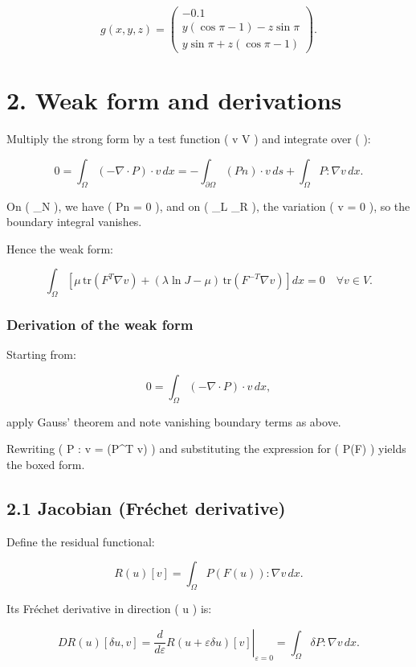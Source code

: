 \documentclass[
  letterpaper,
  DIV=11,
  numbers=noendperiod]{scrartcl}
\begin{document}
\[
g(x, y, z) =
\begin{pmatrix}
-0.1 \\
y(\cos \pi - 1) - z \sin \pi \\
y \sin \pi + z(\cos \pi - 1)
\end{pmatrix}.
\]

\section{2. Weak form and derivations}\label{weak-form-and-derivations}

Multiply the strong form by a test function ( v \in V ) and integrate
over ( \Omega ):

\[
0 = \int_\Omega (-\nabla \cdot P) \cdot v \, dx = -\int_{\partial \Omega} (Pn) \cdot v \, ds + \int_\Omega P : \nabla v \, dx.
\]

On ( \Gamma\_N ), we have ( Pn = 0 ), and on ( \Gamma\_L \cup \Gamma\_R
), the variation ( v = 0 ), so the boundary integral vanishes.

Hence the weak form:

\[
\int_\Omega \left[ \mu\, \text{tr}(F^T \nabla v) + (\lambda \ln J - \mu)\, \text{tr}(F^{-T} \nabla v) \right] dx = 0 \quad \forall v \in V.
\]

\subsubsection{Derivation of the weak
form}\label{derivation-of-the-weak-form}

Starting from:

\[
0 = \int_\Omega (-\nabla \cdot P) \cdot v \, dx,
\]

apply Gauss' theorem and note vanishing boundary terms as above.

Rewriting ( P : \nabla v = (P\^{}T \nabla v) ) and substituting
the expression for ( P(F) ) yields the boxed form.

\subsection{2.1 Jacobian (Fréchet
derivative)}\label{jacobian-fruxe9chet-derivative}

Define the residual functional:

\[
R(u)[v] = \int_\Omega P(F(u)) : \nabla v \, dx.
\]

Its Fréchet derivative in direction ( \delta u ) is:

\[
DR(u)[\delta u, v] =
\left. \frac{d}{d\varepsilon} R(u + \varepsilon \delta u)[v] \right|_{\varepsilon = 0}
= \int_\Omega \delta P : \nabla v \, dx.
\]
\end{document}
